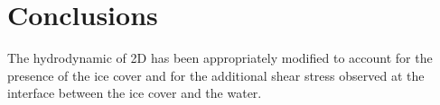 %
%
%
%


\section{Conclusions}

The hydrodynamic of \telemac2D has been appropriately modified to account for the presence of the ice cover and for the additional shear stress observed at the interface between the ice cover and the water.


\renewcommand{\labelitemi}{\textbullet}
